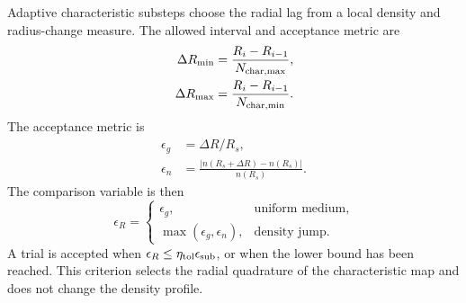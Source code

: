 \documentclass[twocolumn]{aastex702}
\begin{document}
Adaptive characteristic substeps choose the radial lag from a local density and
radius-change measure.  The allowed interval and acceptance metric are
\begin{equation}
\begin{aligned}
\Delta R_{\min}&=\frac{R_i-R_{i-1}}{N_{\rm char,max}},\\
\Delta R_{\max}&=\frac{R_i-R_{i-1}}{N_{\rm char,min}}.
\end{aligned}
\end{equation}
The acceptance metric is
\begin{equation}
\begin{aligned}
\epsilon_g&=\Delta R/R_s,\\
\epsilon_n&=\frac{|n(R_s+\Delta R)-n(R_s)|}{n(R_s)} .
\end{aligned}
\end{equation}
The comparison variable is then
\begin{equation}
\epsilon_R=
\begin{cases}
\epsilon_g, & \text{uniform medium},\\
\max\left(\epsilon_g,\epsilon_n\right), & \text{density jump}.
\end{cases}
\end{equation}
A trial is accepted when \(\epsilon_R\le\eta_{\rm tol}\epsilon_{\rm sub}\), or
when the lower bound has been reached.  This criterion selects the radial
quadrature of the characteristic map and does not change the density profile.
\end{document}
